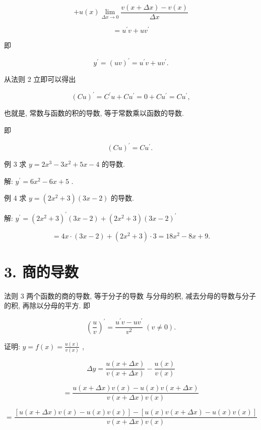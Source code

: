\documentclass[lang=cn,newtx,10pt,scheme=chinese]{elegantbook}
\begin{document}
\[
+ u\left( x\right) \mathop{\lim }\limits_{{{\Delta x} \rightarrow 0}}\frac{v\left( {x + {\Delta x}}\right) - v\left( x\right) }{\Delta x}
\]

\[
= {u}^{\prime }v + u{v}^{\prime }
\]

即

\[
{y}^{\prime } = {\left( uv\right) }^{\prime } = {u}^{\prime }v + u{v}^{\prime }.
\]

从法则 2 立即可以得出

\[
{\left( Cu\right) }^{\prime } = {C}^{\prime }u + C{u}^{\prime } = 0 + C{u}^{\prime } = C{u}^{\prime },
\]

也就是, 常数与函数的积的导数, 等于常数乘以函数的导数.

即

\[
{\left( Cu\right) }^{\prime } = C{u}^{\prime }\text{. }
\]

例 3 求 \(y = 2{x}^{3} - 3{x}^{2} + {5x} - 4\) 的导数.

解: \({y}^{\prime } = 6{x}^{2} - {6x} + 5\) .

例 4 求 \(y = \left( {2{x}^{2} + 3}\right) \left( {{3x} - 2}\right)\) 的导数.

解: \({y}^{\prime } = {\left( 2{x}^{2} + 3\right) }^{\prime }\left( {{3x} - 2}\right) + \left( {2{x}^{2} + 3}\right) {\left( 3x - 2\right) }^{\prime }\)

\[
= {4x} \cdot \left( {{3x} - 2}\right) + \left( {2{x}^{2} + 3}\right) \cdot 3 = {18}{x}^{2} - {8x} + 9\text{.}
\]

\section*{3. 商的导数}

法则 3 两个函数的商的导数, 等于分子的导数 与分母的积, 减去分母的导数与分子的积, 再除以分母的平方. 即

\[
{\left( \frac{u}{v}\right) }^{\prime } = \frac{{u}^{\prime }v - u{v}^{\prime }}{{v}^{2}}\;\left( {v \neq 0}\right) .
\]

证明: \(y = f\left( x\right) = \frac{u\left( x\right) }{v\left( x\right) }\) ,

\[
{\Delta y} = \frac{u\left( {x + {\Delta x}}\right) }{v\left( {x + {\Delta x}}\right) } - \frac{u\left( x\right) }{v\left( x\right) }
\]

\[
= \frac{u\left( {x + {\Delta x}}\right) v\left( x\right) - u\left( x\right) v\left( {x + {\Delta x}}\right) }{v\left( {x + {\Delta x}}\right) v\left( x\right) }
\]

\[
= \frac{\left\lbrack {u\left( {x + {\Delta x}}\right) v\left( x\right) - u\left( x\right) v\left( x\right) }\right\rbrack - \left\lbrack {u\left( x\right) v\left( {x + {\Delta x}}\right) - u\left( x\right) v\left( x\right) }\right\rbrack }{v\left( {x + {\Delta x}}\right) v\left( x\right) }
\]
\end{document}
